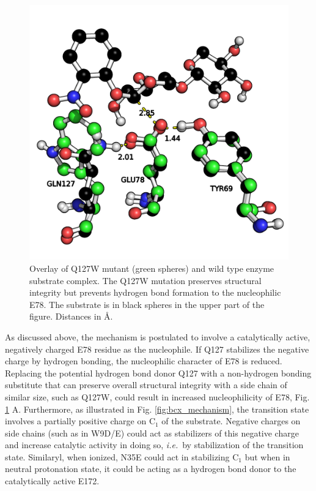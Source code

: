 \begin{figure}[htbp] 
\centering
\includegraphics[width=0.69\linewidth]{hbonds-es-wt-q127.png}
\caption{
Overlay of Q127W mutant (green spheres) and wild type enzyme substrate complex.
The Q127W mutation preserves structural integrity but prevents hydrogen bond formation to the nucleophilic E78.
The substrate is in black spheres in the upper part of the figure.
Distances in \AA\cite{hediger2013computational}.
}
\label{fig:bcx_rationalization}
\end{figure}
As discussed above, the mechanism is postulated to involve a catalytically active, negatively charged E78 residue as the nucleophile.
If Q127 stabilizes the negative charge by hydrogen bonding, the nucleophilic character of E78 is reduced.
Replacing the potential hydrogen bond donor Q127 with a non-hydrogen bonding substitute that can preserve overall structural integrity with a side chain of similar size, such as Q127W, could result in increased nucleophilicity of E78, Fig. \ref{fig:bcx_rationalization} A.
Furthermore, as illustrated in Fig. \ref{fig:bcx_mechanism}, the transition state involves a partially positive charge on C$_1$ of the substrate.
Negative charges on side chains (such as in W9D/E) could act as stabilizers of this negative charge and increase catalytic activity in doing so, \textit{i.e.} by stabilization of the transition state.
Similaryl, when ionized, N35E could act in stabilizing C$_1$ but when in neutral protonation state, it could be acting as a hydrogen bond donor to the catalytically active E172.
